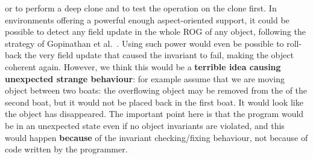 

or to perform a deep clone and to test the operation on the clone first.
In environments offering a powerful enough aspect-oriented support,
it could be possible to detect any field update in the whole ROG of
any object, following the strategy of 
Gopinathan et al.~\cite{Gopinathan:2008:RMO:1483018.1483028}.
Using such power would even be possible to roll-back the very field update that caused 
the invariant to fail, making the object coherent again.
However, we think this would be a \textbf{terrible idea causing unexpected strange behaviour}: for example
assume that we are moving object between two boats:
the overflowing object may be removed from the \Q@cargo@ of the second boat, but it would not
be placed back in the first boat. It would look like the object has disappeared.
The important point here is that the program would be in an unexpected state
even if no object invariants are violated, and this would happen \textbf{because} of the 
invariant checking/fixing behaviour, not because of code written by the programmer.

